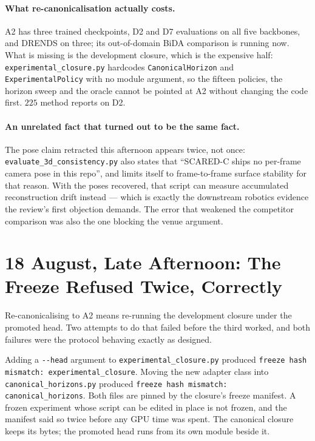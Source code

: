 \documentclass[11pt,a4paper]{article}
\begin{document}
\paragraph{What re-canonicalisation actually costs.} A2 has three trained
checkpoints, D2 and D7 evaluations on all five backbones, and DRENDS on three;
its out-of-domain BiDA comparison is running now. What is missing is the
development closure, which is the expensive half: \texttt{experimental\_closure.py}
hardcodes \texttt{CanonicalHorizon} and \texttt{ExperimentalPolicy} with no module
argument, so the fifteen policies, the horizon sweep and the oracle cannot be
pointed at A2 without changing the code first. $225$ method reports on D2.

\paragraph{An unrelated fact that turned out to be the same fact.}
The pose claim retracted this afternoon appears twice, not once:
\texttt{evaluate\_3d\_consistency.py} also states that ``SCARED-C ships no
per-frame camera pose in this repo'', and limits itself to frame-to-frame surface
stability for that reason. With the poses recovered, that script can measure
accumulated reconstruction drift instead --- which is exactly the downstream
robotics evidence the review's first objection demands. The error that weakened
the competitor comparison was also the one blocking the venue argument.


\section*{18 August, Late Afternoon: The Freeze Refused Twice, Correctly}

Re-canonicalising to A2 means re-running the development closure under the
promoted head. Two attempts to do that failed before the third worked, and both
failures were the protocol behaving exactly as designed.

Adding a \texttt{-{}-head} argument to \texttt{experimental\_closure.py} produced
\texttt{freeze hash mismatch: experimental\_closure}. Moving the new adapter class
into \texttt{canonical\_horizons.py} produced \texttt{freeze hash mismatch:
canonical\_horizons}. Both files are pinned by the closure's freeze manifest. A
frozen experiment whose script can be edited in place is not frozen, and the
manifest said so twice before any GPU time was spent. The canonical closure keeps
its bytes; the promoted head runs from its own module beside it.
\end{document}
